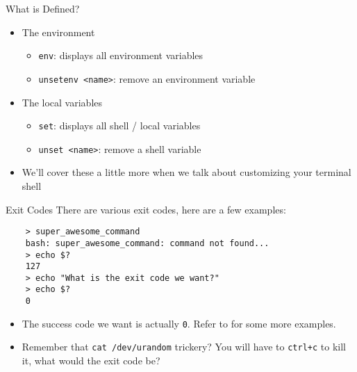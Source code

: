 \begin{frame}[fragile]{What is Defined?}
  \begin{itemize}[<+- | alert@+>]
      \item The environment
      \begin{itemize}[<+- | alert@+>]
        \item \texttt{env}: displays all environment variables
        \item \texttt{unsetenv <name>}: remove an environment variable
      \end{itemize}
      \item The local variables
      \begin{itemize}[<+- | alert@+>]
        \item \texttt{set}: displays all shell / local variables
        \item \texttt{unset <name>}: remove a shell variable
      \end{itemize}
      \item We'll cover these a little more when we talk about customizing your terminal shell
  \end{itemize}
\end{frame}

\begin{frame}[fragile]{Exit Codes}
  There are various exit codes, here are a few examples:
  \begin{verbatim}
    > super_awesome_command
    bash: super_awesome_command: command not found...
    > echo $?
    127
    > echo "What is the exit code we want?"
    > echo $?
    0
  \end{verbatim}
  \begin{itemize}[<+- | alert@+>]
    \item The success code we want is actually \texttt{0}.  Refer to \cite{exit} for some more examples.
    \item Remember that \texttt{cat /dev/urandom} trickery?  You will have to \texttt{ctrl+c} to kill it, what
          would the exit code be?
  \end{itemize}
\end{frame}

